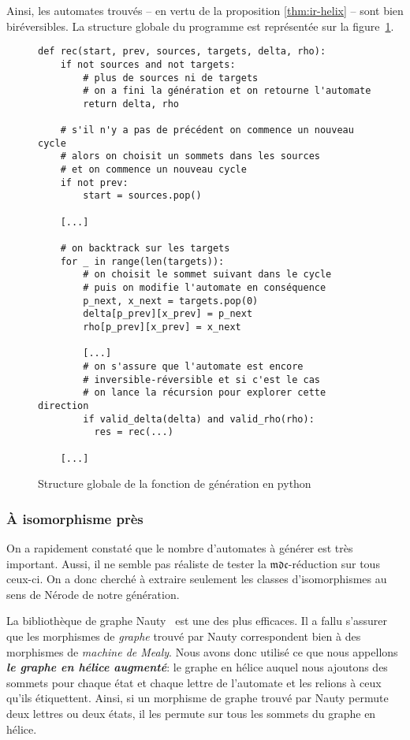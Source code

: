 \documentclass[11pt,a4paper]{article}
\begin{document}
Ainsi, les automates trouvés -- en vertu de la proposition \ref{thm:ir-helix} -- sont bien biréversibles. La structure globale du programme est représentée sur la figure~\ref{fig:gen-pseudo-code}.

\begin{figure}[!ht]
\begin{verbatim}
def rec(start, prev, sources, targets, delta, rho):
    if not sources and not targets:
        # plus de sources ni de targets
        # on a fini la génération et on retourne l'automate
        return delta, rho

    # s'il n'y a pas de précédent on commence un nouveau cycle
    # alors on choisit un sommets dans les sources
    # et on commence un nouveau cycle
    if not prev:
        start = sources.pop()

    [...]

    # on backtrack sur les targets
    for _ in range(len(targets)):
        # on choisit le sommet suivant dans le cycle
        # puis on modifie l'automate en conséquence
        p_next, x_next = targets.pop(0)
        delta[p_prev][x_prev] = p_next
        rho[p_prev][x_prev] = x_next

        [...]
        # on s'assure que l'automate est encore
        # inversible-réversible et si c'est le cas
        # on lance la récursion pour explorer cette direction
        if valid_delta(delta) and valid_rho(rho):
          res = rec(...)

    [...]

\end{verbatim}
  \caption{Structure globale de la fonction de génération en python\label{fig:gen-pseudo-code}}
\end{figure}

\subsubsection*{À isomorphisme près}

On a rapidement constaté que le nombre d'automates à générer est très important. Aussi, il ne semble pas réaliste de tester la $\mathfrak{mdc}$-réduction sur tous ceux-ci. On a donc cherché à extraire seulement les classes d'isomorphismes au sens de Nérode de notre génération.

La bibliothèque de graphe \textrm{Nauty}~\cite{Nauty} est une des plus efficaces. Il a fallu s'assurer que les morphismes de \textit{graphe} trouvé par \textrm{Nauty} correspondent bien à des morphismes de \textit{machine de Mealy}. Nous avons donc utilisé ce que nous appellons \textit{\textbf{le graphe en hélice augmenté}}: le graphe en hélice auquel nous ajoutons des sommets pour chaque état et chaque lettre de l'automate et les relions à ceux qu'ils étiquettent. Ainsi, si un morphisme de graphe trouvé par Nauty permute deux lettres ou deux états, il les permute sur tous les sommets du graphe en hélice.
\end{document}
